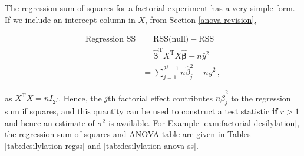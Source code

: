 \documentclass[
]{book}
\newenvironment{Shaded}{\begin{snugshade}}{\end{snugshade}}
\newcommand{\AttributeTok}[1]{\textcolor[rgb]{0.77,0.63,0.00}{#1}}
\newcommand{\DecValTok}[1]{\textcolor[rgb]{0.00,0.00,0.81}{#1}}
\newcommand{\FunctionTok}[1]{\textcolor[rgb]{0.00,0.00,0.00}{#1}}
\newcommand{\NormalTok}[1]{#1}
\newcommand{\OtherTok}[1]{\textcolor[rgb]{0.56,0.35,0.01}{#1}}
\newcommand{\SpecialCharTok}[1]{\textcolor[rgb]{0.00,0.00,0.00}{#1}}
\newcommand{\StringTok}[1]{\textcolor[rgb]{0.31,0.60,0.02}{#1}}
\theoremstyle{definition}
\theoremstyle{definition}
\theoremstyle{definition}
\theoremstyle{definition}
\theoremstyle{remark}
\begin{document}
The regression sum of squares for a factorial experiment has a very simple form. If we include an intercept column in \(X\), from Section \ref{anova-revision},

\begin{align*}
\mbox{Regression SS} & = \mbox{RSS(null)} - \mbox{RSS} \\
& = \hat{\boldsymbol{\beta}}^{\mathrm{T}}X^{\mathrm{T}}X\hat{\boldsymbol{\beta}} - n\bar{y}^2 \\
& = \sum_{j=1}^{2^f-1}n\hat{\beta}_j^2 - n\bar{y}^2\,,
\end{align*}

as \(X^{\mathrm{T}}X = nI_{2^f}\). Hence, the \(j\)th factorial effect contributes \(n\hat{\beta}_j^2\) to the regression sum if squares, and this quantity can be used to construct a test statistic \textbf{if} \(r>1\) and hence an estimate of \(\sigma^2\) is available. For Example \ref{exm:factorial-desilylation}, the regression sum of squares and ANOVA table are given in Tables \ref{tab:desilylation-regss} and \ref{tab:desilylation-anova-ss}.

\begin{Shaded}
\end{Shaded}
\end{document}

